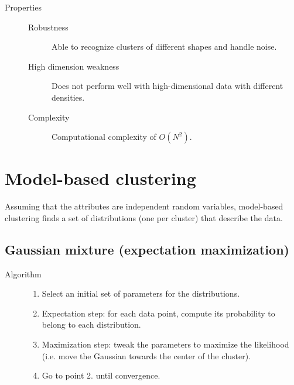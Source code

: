 \begin{description}
    \item[Properties] \phantom{}
        \begin{description}
            \item[Robustness]
                Able to recognize clusters of different shapes and handle noise.

            \item[High dimension weakness]
                Does not perform well with high-dimensional data with different densities.

            \item[Complexity]
                Computational complexity of $O(N^2)$.
        \end{description}
\end{description}



\section{Model-based clustering}

Assuming that the attributes are independent random variables,
model-based clustering finds a set of distributions (one per cluster) that describe the data.


\subsection*{Gaussian mixture (expectation maximization)}

\begin{description}
    \item[Algorithm] \phantom{}  
    \begin{enumerate}
        \item Select an initial set of parameters for the distributions.
        \item Expectation step: for each data point, compute its probability to belong to each distribution.
        \item Maximization step: tweak the parameters to maximize the likelihood (i.e. move the Gaussian towards the center of the cluster).
        \item Go to point 2. until convergence.
    \end{enumerate}
\end{description}